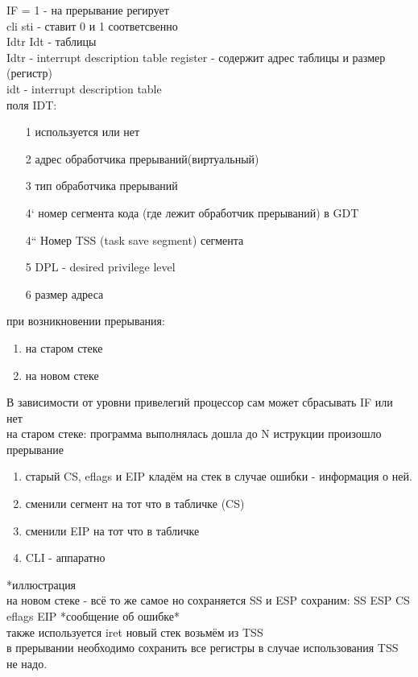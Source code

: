 \documentclass[a4paper, 12pt]{article}
\begin{document}
IF = 1 - на прерывание регирует \\
cli sti - ставит 0 и 1 соответсвенно\\
Idtr Idt - таблицы\\
Idtr - interrupt description table  register - содержит адрес таблицы и размер (регистр) \\
idt - interrupt description table \\
поля IDT:
\begin{enumerate}
    \item[1] используется или нет
    \item[2] адрес обработчика прерываний(виртуальный)
    \item[3] тип обработчика прерываний
    \item[4`] номер сегмента кода (где лежит обработчик прерываний) в GDT
    \item[4``] Номер TSS (task save segment) сегмента
    \item[5] DPL - desired privilege level
    \item[6] размер адреса 
\end{enumerate}
при возникновении прерывания:
\begin{enumerate}
    \item на старом стеке
    \item на новом стеке
\end{enumerate}
В зависимости от уровни привелегий процессор сам может сбрасывать IF или нет \\
на старом стеке: программа выполнялась дошла до N иструкции произошло прерывание \\
\begin{enumerate}
\item старый CS, eflags и EIP кладём на стек в случае ошибки - информация о ней.
\item сменили сегмент на тот что в табличке (CS)
\item сменили EIP на тот что в табличке
\item CLI - аппаратно
\end{enumerate}
*иллюстрация \\
на новом стеке - всё то же самое но сохраняется SS и ESP сохраним: SS ESP CS eflags EIP *сообщение об ошибке* \\
также используется iret новый стек возьмём из TSS \\
в прерывании необходимо сохранить все регистры в случае использования TSS не надо. \\
\end{document}
